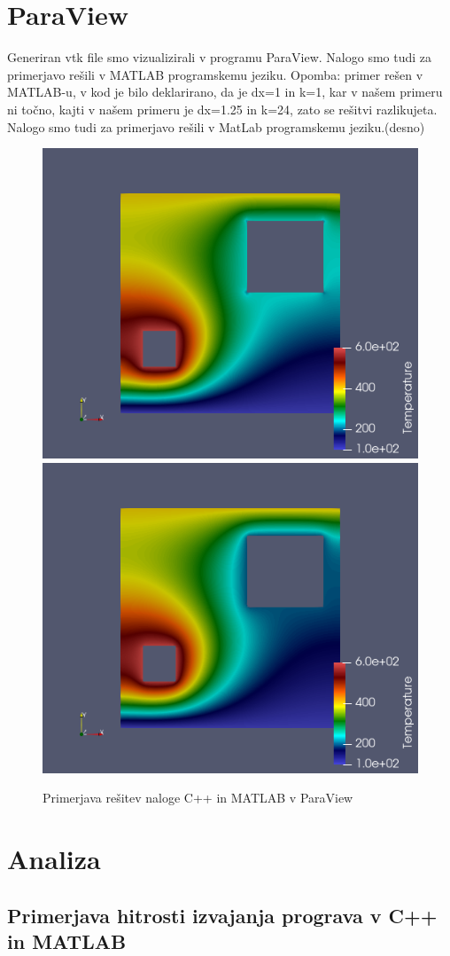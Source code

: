 \documentclass[12pt]{article}
\begin{document}
\section{ParaView}
Generiran vtk file smo vizualizirali v programu ParaView. 
\newline Nalogo smo tudi za primerjavo rešili v MATLAB programskemu jeziku. Opomba: primer rešen v MATLAB-u, v kod je bilo deklarirano, da je dx=1 in k=1, kar v našem primeru ni točno, kajti v našem primeru je dx=1.25 in k=24, zato se rešitvi razlikujeta.
\newline Nalogo smo tudi za primerjavo rešili v MatLab programskemu jeziku.(desno)
    \begin{figure}[ht]
        \centering
        \includegraphics[width=0.35\linewidth]{paraview.png}
        \includegraphics[width=0.35\linewidth]{rezMatlab.png}
        \renewcommand*\figurename{Slika}
        \caption{Primerjava rešitev naloge C++ in MATLAB v ParaView}
        \label{Slika:13}
    \end{figure}

\newpage
\FloatBarrier
\section{Analiza}

\subsection{Primerjava hitrosti izvajanja prograva v C++ in MATLAB}
\end{document}
